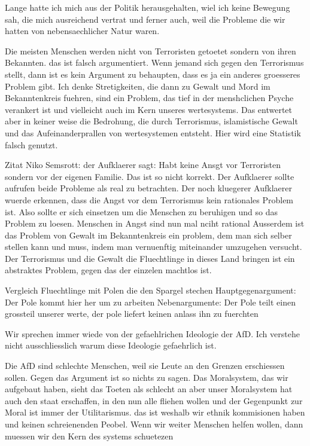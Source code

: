 \documentclass{turabian-researchpaper}
\begin{document}
Lange hatte ich mich aus der Politik herausgehalten, wiel ich keine Bewegung sah, die mich ausreichend vertrat und ferner auch, weil die Probleme die wir hatten von nebensaechlicher Natur waren.

Die meisten Menschen werden nicht von Terroristen getoetet sondern von ihren Bekannten. das ist falsch argumentiert. Wenn jemand sich gegen den Terrorismus stellt, dann ist es kein Argument zu behaupten, dass es ja ein anderes groesseres Problem gibt. Ich denke Stretigkeiten, die dann zu Gewalt und Mord im Bekanntenkreis fuehren, sind ein Problem, das tief in der menshclichen Psyche verankert ist und vielleicht auch im Kern unseres wertesystems. Das entwertet aber in keiner weise die Bedrohung, die durch Terrorismus, islamistische Gewalt und das Aufeinanderprallen von wertesystemen entsteht. Hier wird eine Statistik falsch genutzt.

Zitat Niko Semsrott: der Aufklaerer sagt: Habt keine Ansgt vor Terroristen sondern vor der eigenen Familie. 
Das ist so nicht korrekt. Der Aufklaerer sollte aufrufen beide Probleme als real zu betrachten. Der noch kluegerer Aufklaerer wuerde erkennen, dass die Angst vor dem Terrorismus kein rationales Problem ist. Also sollte er sich einsetzen um die Menschen zu beruhigen und so das Problem zu loesen. Menschen in Angst sind nun mal nciht rational
Ausserdem ist das Problem von Gewalt im Bekanntenkreis ein problem, dem man sich selber stellen kann und muss, indem man vernuenftig miteinander umzugehen versucht. Der Terrorismus und die Gewalt die Fluechtlinge in dieses Land bringen ist ein abstraktes Problem, gegen das der einzelen machtlos ist.

Vergleich Fluechtlinge mit Polen die den Spargel stechen
Hauptgegenargument: Der Pole kommt hier her um zu arbeiten
Nebenargumente: Der Pole teilt einen grossteil unserer werte, der pole liefert keinen anlass ihn zu fuerchten

Wir sprechen immer wiede von der gefaehlrichen Ideologie der AfD. Ich verstehe nicht ausschliesslich warum diese Ideologie gefaehrlich ist.

Die AfD sind schlechte Menschen, weil sie Leute an den Grenzen erschiessen sollen. Gegen das Argument ist so nichts zu sagen. Das Moralsystem, das wir aufgebaut haben, sieht das Toeten als schlecht an aber unser Moralsystem hat auch den staat erschaffen, in den nun alle fliehen wollen und der Gegenpunkt zur Moral ist immer der Utilitarismus. das ist weshalb wir ethnik kommisionen haben und keinen schreienenden Peobel. Wenn wir weiter Menschen helfen wollen, dann muessen wir den Kern des systems schuetezen
\end{document}
